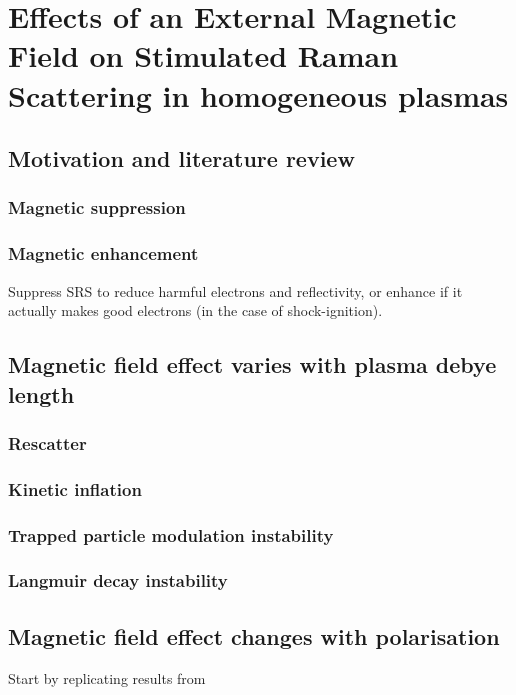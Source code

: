 \chapter{Effects of an External Magnetic Field on Stimulated Raman Scattering in homogeneous plasmas}
\label{chp:magSRS}

\section{Motivation and literature review}
\subsection{Magnetic suppression}
\subsection{Magnetic enhancement}
Suppress SRS to reduce harmful electrons and reflectivity, or enhance if it actually makes good electrons (in the case of shock-ignition).

\section{Magnetic field effect varies with plasma debye length}
\subsection{Rescatter}
\subsection{Kinetic inflation}
\subsection{Trapped particle modulation instability}
\subsection{Langmuir decay instability}

\section{Magnetic field effect changes with polarisation}

Start by replicating results from \cite{Winjum2018}

%
%
